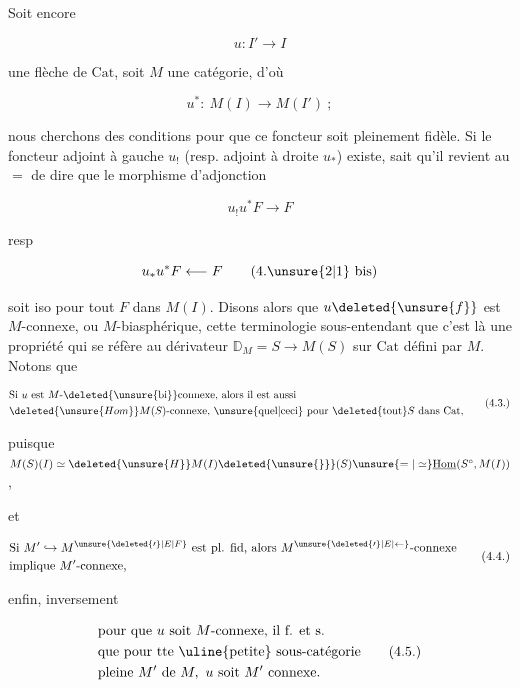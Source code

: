 Soit encore

\[
u:I'\longrightarrow I
\]

une flèche de $\mathrm{Cat}$, soit $M$ une catégorie, d'où  

\[
u^*:\ M(I)\longrightarrow M(I')\ ;\tag*{(4.1.)}
\]

 nous cherchons des conditions  pour que ce foncteur soit pleinement fidèle. Si le foncteur adjoint à gauche $u_!$ (resp. adjoint à droite $u_*$) existe,  sait qu'il revient au $=$ de dire que le morphisme d'adjonction

\[
u_!u^*F\longrightarrow F\tag*{(4.2)}
\]

resp

\[
u_*u^*F\longleftarrow F\tag*{(4.\unsure{2|1} bis)}
\]

soit iso pour tout $F$ dans $M(I)$. Disons alors que $u\deleted{\unsure{f}}$ est $M$-connexe, ou $M$-biasphérique, cette terminologie sous-entendant que c'est là une propriété qui se réfère au dérivateur $\mathbb{D}_M=S\longrightarrow M(S)$ sur $\mathrm{Cat}$ défini par $M$. Notons que

\[
\begin{aligned}
&\text{Si }u\text{ est }M\text{-}\deleted{\unsure{\mathrm{bi}}}\text{connexe, alors il est aussi}\\
&\deleted{\unsure{Hom}} M(S)\text{-connexe, \unsure{quel|ceci} pour }\deleted{\text{tout}} S\text{ dans }\mathrm{Cat},
\end{aligned}\tag*{(4.3.)}
\]

puisque $M(S)(I)\simeq\deleted{\unsure{H}}M(I)\deleted{\unsure{\}}}(S)\unsure{=|\simeq}\underline{\mathrm{Hom}}(S^\circ,M(I))$,

et

\[
\begin{aligned}
&\text{Si }M'\hookrightarrow M^{\unsure{\deleted{\prime}|E|F}}\text{ est pl. fid, alors }M^{\unsure{\deleted{\prime}|E|\leftarrow}}\text{-connexe}\\
&\text{implique }M'\text{-connexe,}
\end{aligned}\tag*{(4.4.)}
\]

enfin, inversement

\[
\begin{aligned}
&\text{pour que }u\text{ soit }M\text{-connexe, il f. et s.}\\
&\text{que pour tte \uline{petite} sous-catégorie}\\
&\text{pleine }M'\text{ de }M,\ u\text{ soit }M'\text{ connexe.}
\end{aligned}\tag*{(4.5.)}
\]

